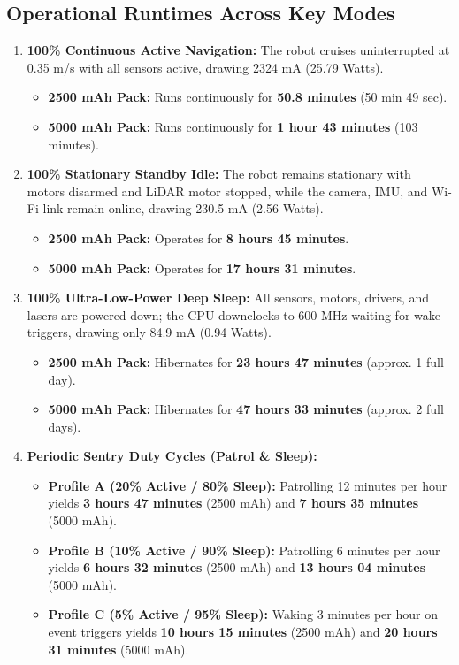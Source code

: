 \documentclass[11pt,a4paper]{article}
\begin{document}
\subsection{Operational Runtimes Across Key Modes}
\begin{enumerate}
    \item \textbf{100\% Continuous Active Navigation:} The robot cruises uninterrupted at 0.35 m/s with all sensors active, drawing 2324 mA (25.79 Watts). 
    \begin{itemize}[noitemsep]
        \item \textbf{2500 mAh Pack:} Runs continuously for \textbf{50.8 minutes} (50 min 49 sec).
        \item \textbf{5000 mAh Pack:} Runs continuously for \textbf{1 hour 43 minutes} (103 minutes).
    \end{itemize}
    \item \textbf{100\% Stationary Standby Idle:} The robot remains stationary with motors disarmed and LiDAR motor stopped, while the camera, IMU, and Wi-Fi link remain online, drawing 230.5 mA (2.56 Watts).
    \begin{itemize}[noitemsep]
        \item \textbf{2500 mAh Pack:} Operates for \textbf{8 hours 45 minutes}.
        \item \textbf{5000 mAh Pack:} Operates for \textbf{17 hours 31 minutes}.
    \end{itemize}
    \item \textbf{100\% Ultra-Low-Power Deep Sleep:} All sensors, motors, drivers, and lasers are powered down; the CPU downclocks to 600 MHz waiting for wake triggers, drawing only 84.9 mA (0.94 Watts).
    \begin{itemize}[noitemsep]
        \item \textbf{2500 mAh Pack:} Hibernates for \textbf{23 hours 47 minutes} (approx. 1 full day).
        \item \textbf{5000 mAh Pack:} Hibernates for \textbf{47 hours 33 minutes} (approx. 2 full days).
    \end{itemize}
    \item \textbf{Periodic Sentry Duty Cycles (Patrol \& Sleep):}
    \begin{itemize}[noitemsep]
        \item \textbf{Profile A (20\% Active / 80\% Sleep):} Patrolling 12 minutes per hour yields \textbf{3 hours 47 minutes} (2500 mAh) and \textbf{7 hours 35 minutes} (5000 mAh).
        \item \textbf{Profile B (10\% Active / 90\% Sleep):} Patrolling 6 minutes per hour yields \textbf{6 hours 32 minutes} (2500 mAh) and \textbf{13 hours 04 minutes} (5000 mAh).
        \item \textbf{Profile C (5\% Active / 95\% Sleep):} Waking 3 minutes per hour on event triggers yields \textbf{10 hours 15 minutes} (2500 mAh) and \textbf{20 hours 31 minutes} (5000 mAh).
    \end{itemize}
\end{enumerate}
\end{document}
